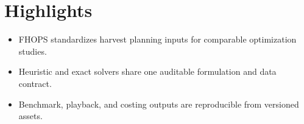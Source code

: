 \section*{Highlights}
\begin{itemize}
  \item FHOPS standardizes harvest planning inputs for comparable optimization studies.
  \item Heuristic and exact solvers share one auditable formulation and data contract.
  \item Benchmark, playback, and costing outputs are reproducible from versioned assets.
\end{itemize}
